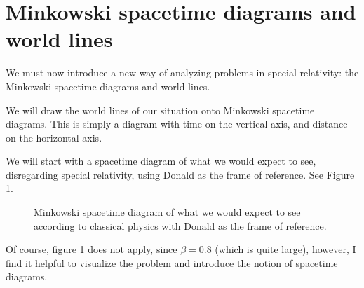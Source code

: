\section{Minkowski spacetime diagrams and world lines}
	We must now introduce a new way of analyzing problems in special relativity: the Minkowski spacetime diagrams and world lines.

	We will draw the world lines of our situation onto Minkowski spacetime diagrams.
	This is simply a diagram with time on the vertical axis, and distance on the horizontal axis.

	We will start with a spacetime diagram of what we would expect to see, disregarding special relativity, using Donald as the frame of reference. See Figure \ref{fig:classicalMinkowski}.
	\begin{figure}[H]
		\centering
		\caption{Minkowski spacetime diagram of what we would expect to see according to classical physics with Donald as the frame of reference.}
		\label{fig:classicalMinkowski}
	\end{figure}
	Of course, figure \ref{fig:classicalMinkowski} does not apply, since $\beta = 0.8$ (which is quite large), however, I find it helpful to visualize the problem and introduce the notion of spacetime diagrams.
